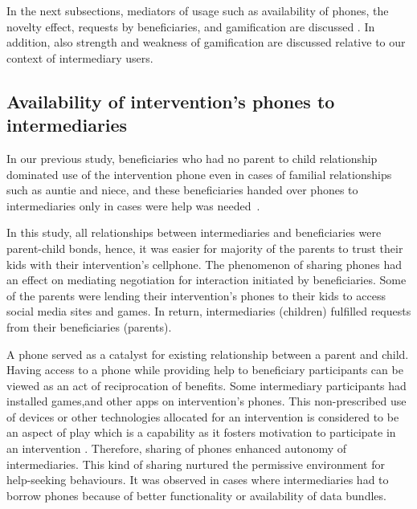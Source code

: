 \documentclass{sig-alternate}
\begin{document}
In the next subsections, mediators of usage such as availability of phones, the novelty effect, requests by beneficiaries, and gamification are discussed . In addition, also strength and weakness of gamification are discussed relative to our context of intermediary users.
\subsection*{\textbf{Availability of intervention's phones to intermediaries}}
In our previous study, beneficiaries who had no parent to child relationship dominated  use of the intervention phone even in cases of familial relationships such as auntie and niece, and these beneficiaries handed over phones to intermediaries only in cases were help was needed~\cite{katule2016:leveraging}.

In this study, all relationships between intermediaries and beneficiaries were parent-child bonds, hence, it was easier for majority of the parents to trust their kids with their intervention's cellphone. The phenomenon of sharing phones had an effect on mediating negotiation for interaction initiated by beneficiaries. Some of the parents were lending their intervention's phones to their kids to access social media sites and games. In return, intermediaries (children) fulfilled requests from their beneficiaries (parents).

A phone served as a catalyst for existing relationship between a parent and child. Having access to a phone while providing help to beneficiary participants can be viewed as an act of reciprocation of benefits. Some intermediary participants had installed games,and  other apps on intervention's phones. This non-prescribed use of devices or other technologies allocated for an intervention is considered to be an aspect of play which is a capability as it fosters motivation to participate in an intervention \cite{ferr2015:play}. Therefore, sharing of phones enhanced autonomy of intermediaries. This kind of sharing nurtured the permissive environment for help-seeking behaviours. It was observed in cases where intermediaries had to borrow phones because of better functionality or availability of data bundles.  
\end{document}
